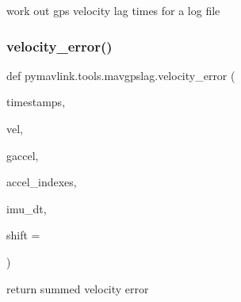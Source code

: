 \begin{DoxyVerb}work out gps velocity lag times for a log file\end{DoxyVerb}
 \mbox{\label{namespacepymavlink_1_1tools_1_1mavgpslag_ab86565b5a9f5c4a8ffd725b81faeb819}} 
\subsubsection{\texorpdfstring{velocity\+\_\+error()}{velocity\_error()}}
{\footnotesize\ttfamily def pymavlink.\+tools.\+mavgpslag.\+velocity\+\_\+error (\begin{DoxyParamCaption}\item[{}]{timestamps,  }\item[{}]{vel,  }\item[{}]{gaccel,  }\item[{}]{accel\+\_\+indexes,  }\item[{}]{imu\+\_\+dt,  }\item[{}]{shift = {} }\end{DoxyParamCaption})}

\begin{DoxyVerb}return summed velocity error\end{DoxyVerb}
 